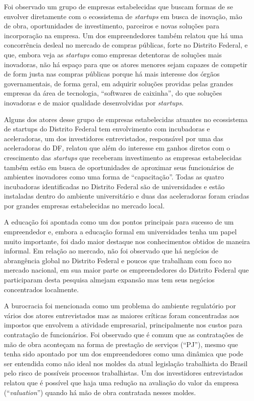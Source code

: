 Foi observado um grupo de empresas estabelecidas que buscam formas de se envolver diretamente com o ecossistema de \textit{startups} em busca de inovação, mão de obra, oportunidades de investimento, parceiros e novas soluções para incorporação na empresa. Um dos empreendedores também relatou que há uma concorrência desleal no mercado de compras públicas, forte no Distrito Federal, e que, embora veja as \textit{startups} como empresas detentoras de soluções mais inovadoras, não há espaço para que os atores menores sejam capazes de competir de form justa nas compras públicas porque há mais interesse dos órgãos governamentais, de forma geral, em adquirir soluções providas pelas grandes empresas da área de tecnologia, ``softwares de caixinha'', do que soluções inovadoras e de maior qualidade desenvolvidas por \textit{startups}.

Alguns dos atores desse grupo de empresas estabelecidas atuantes no ecossistema de startups do Distrito Federal tem envolvimento com incubadoras e aceleradoras, um dos investidores entrevistados, responsável por uma das aceleradoras do DF, relatou que além do interesse em ganhos diretos com o crescimento das \textit{startups} que receberam investimento as empresas estabelecidas também estão em busca de oportunidades de aproximar seus funcionários de ambientes inovadores como uma forma de ``capacitação''. Todas as quatro incubadoras identificadas no Distrito Federal são de universidades e estão instaladas dentro do ambiente universitário e duas das aceleradoras foram criadas por grandes empresas estabelecidas no mercado local. 

A educação foi apontada como um dos pontos principais para sucesso de um empreendedor e, embora a educação formal em universidades tenha um papel muito importante, foi dado maior destaque nos conhecimentos obtidos de maneira informal. Em relação ao mercado, não foi observado que há negócios de abrangência global no Distrito Federal e poucos que trabalham com foco no mercado nacional, em sua maior parte os empreendedores do Distrito Federal que participaram desta pesquisa almejam expansão mas tem seus negócios concentrados localmente.

A burocracia foi mencionada como um problema do ambiente regulatório por vários dos atores entrevistados mas as maiores críticas foram concentradas aos impostos que envolvem a atividade empresarial, principalmente nos custos para contratação de funcionários. Foi observado que é comum que as contratações de mão de obra aconteçam na forma de prestação de serviços (``PJ''), mesmo que tenha sido apontado por um dos empreendedores como uma dinâmica que pode ser entendida como não ideal nos moldes da atual legislação trabalhista do Brasil pelo risco de possíveis processos trabalhistas. Um dos investidores entrevistados relatou que é possível que haja uma redução na avaliação do valor da empresa (``\textit{valuation}'') quando há mão de obra contratada nesses moldes.